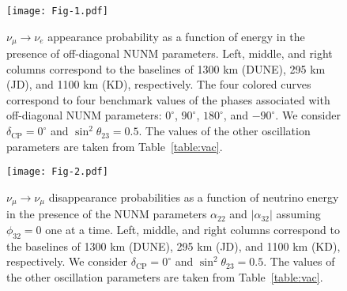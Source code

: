 \documentclass[11pt,a4paper]{article}
\newcommand{\capdef}{}
\newcommand{\mycaption}[2][\capdef]{\renewcommand{\capdef}{#2}
	\caption[#1]{{\footnotesize #2}}}
\begin{document}
\begin{figure}[h!]
\centering
\texttt{[image: Fig-1.pdf]}
\vspace{-0.8cm}
\mycaption{$\nu_{\mu}\rightarrow\nu_{e}$ appearance probability as a function of energy in the presence of off-diagonal NUNM parameters. Left, middle, and right columns correspond to the baselines of 1300 km (DUNE), 295 km (JD), and 1100 km (KD), respectively. The four colored curves correspond to four benchmark values of the phases associated with off-diagonal NUNM parameters: $0^{\circ}$, $90^{\circ}$, $180^{\circ}$, and $-90^{\circ}$. We consider $\delta_{\mathrm{CP}} = 0^{\circ}$ and $\sin^2\theta_{23}=0.5$. The values of the other oscillation parameters are taken from Table~\ref{table:vac}. }
\label{fig:prob_mue}
\end{figure}
\begin{figure}[h!]
\centering
\texttt{[image: Fig-2.pdf]}
\vspace{-0.5cm}
\mycaption{$\nu_{\mu}\rightarrow\nu_{\mu}$ disappearance probabilities as a function of neutrino energy in the presence of the NUNM parameters $\alpha_{22}$ and $|\alpha_{32}|$ assuming $\phi_{32}=0$ one at a time. Left, middle, and right columns correspond to the baselines of 1300 km (DUNE), 295 km (JD), and 1100 km (KD), respectively. We consider $\delta_{\mathrm{CP}} = 0^{\circ}$ and $\sin^2\theta_{23}=0.5$. The values of the other oscillation parameters are taken from Table~\ref{table:vac}.}
\label{fig:prob_mumu}
\end{figure}
\end{document}

